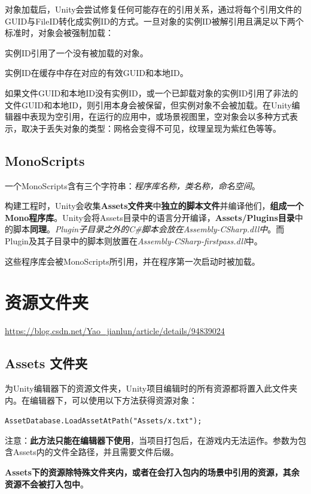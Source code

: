 \documentclass[UTF8,a4paper,12pt]{ctexbook}
\begin{document}
			对象加载后，Unity会尝试修复任何可能存在的引用关系，通过将每个引用文件的GUID与FileID转化成实例ID的方式。一旦对象的实例ID被解引用且满足以下两个标准时，对象会被强制加载：
			
	        实例ID引用了一个没有被加载的对象。
			
	        实例ID在缓存中存在对应的有效GUID和本地ID。
			
	        如果文件GUID和本地ID没有实例ID，或一个已卸载对象的实例ID引用了非法的文件GUID和本地ID，则引用本身会被保留，但实例对象不会被加载。在Unity编辑器中表现为空引用，在运行的应用中，或场景视图里，空对象会以多种方式表示，取决于丢失对象的类型：网格会变得不可见，纹理呈现为紫红色等等。
	        
		\subsection{MonoScripts}
			一个MonoScripts含有三个字符串：\textit{程序库名称，类名称，命名空间}。 
			
			构建工程时，Unity会收集\textbf{Assets文件夹}中\textbf{独立的脚本文件}并编译他们，\textbf{组成一个Mono程序库}。Unity会将Assets目录中的语言分开编译，\textbf{Assets/Plugins目录}中的脚本\textbf{同理}。\textit{Plugin子目录之外的C\#脚本会放在Assembly-CSharp.dll中}。而Plugin及其子目录中的脚本则放置在\textit{Assembly-CSharp-firstpass.dll}中。 
			
			这些程序库会被MonoScripts所引用，并在程序第一次启动时被加载。
	
	\section{资源文件夹}	
		\url{https://blog.csdn.net/Yao_jianlun/article/details/94839024}
		
		\subsection{Assets 文件夹}
		
		    为Unity编辑器下的资源文件夹，Unity项目编辑时的所有资源都将置入此文件夹内。在编辑器下，可以使用以下方法获得资源对象：
			
	        \verb|AssetDatabase.LoadAssetAtPath("Assets/x.txt");| 
			
	        注意：\textbf{此方法只能在编辑器下使用}，当项目打包后，在游戏内无法运作。参数为包含Assets内的文件全路径，并且需要文件后缀。 
			
	        \color{blue}\textbf{Assets下的资源除特殊文件夹内，或者在会打入包内的场景中引用的资源，其余资源不会被打入包中}。\color{black}
	        
\end{document}
